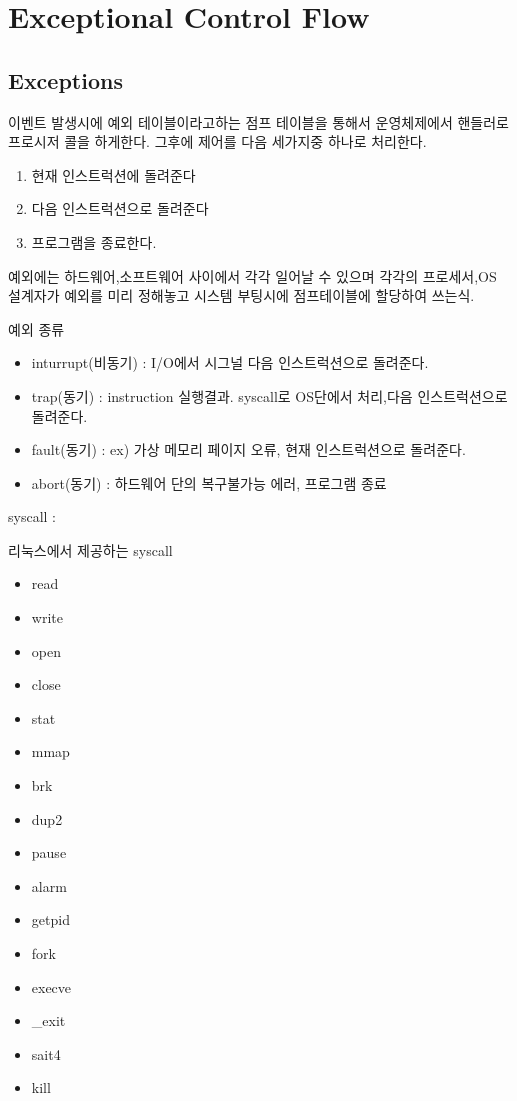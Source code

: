 
\chapter{Exceptional Control Flow}

\section{Exceptions}

이벤트 발생시에 예외 테이블이라고하는 점프 테이블을 통해서 운영체제에서 핸들러로 프로시저 콜을 하게한다.
그후에 제어를 다음 세가지중 하나로 처리한다.

\begin{enumerate}
    \item 현재 인스트럭션에 돌려준다
    \item 다음 인스트럭션으로 돌려준다 
    \item 프로그램을 종료한다.
\end{enumerate}

예외에는 하드웨어,소프트웨어 사이에서 각각 일어날 수 있으며 각각의 프로세서,OS 설계자가 예외를 미리 정해놓고 시스템 부팅시에 점프테이블에 할당하여 쓰는식.

예외 종류
\begin{itemize}
    \item inturrupt(비동기) : I/O에서 시그널  다음 인스트럭션으로 돌려준다.
    \item trap(동기) : instruction 실행결과. syscall로 OS단에서 처리,다음 인스트럭션으로 돌려준다.
    \item fault(동기) : ex) 가상 메모리 페이지 오류, 현재 인스트럭션으로 돌려준다.
    \item abort(동기) : 하드웨어 단의 복구불가능 에러, 프로그램 종료
\end{itemize}

syscall : 

리눅스에서 제공하는 syscall
\begin{itemize}
    \item read
    \item write
    \item open
    \item close
    \item stat
    \item mmap
    \item brk
    \item dup2
    \item pause
    \item alarm
    \item getpid
    \item fork
    \item execve
    \item \_exit
    \item sait4
    \item kill
\end{itemize}


